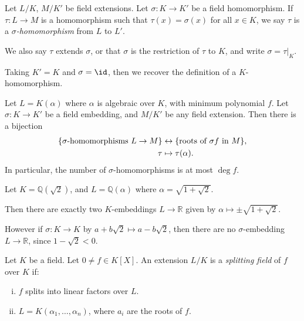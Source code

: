 \documentclass[12pt]{article}
\begin{document}
\begin{definition}
	Let $L/K$, $M/K'$ be field extensions. Let $\sigma : K \to K'$ be a field homomorphism. If $\tau : L \to M$ is a homomorphism such that $\tau(x) = \sigma(x)$ for all $x \in K$, we say $\tau$ is a $\sigma$\emph{-homomorphism} from $L$ to $L'$.

	We also say $\tau$ extends $\sigma$, or that $\sigma$ is the restriction of $\tau$ to $K$, and write $\sigma = \tau|_{K}$.
\end{definition}

Taking $K' = K$ and $\sigma = \id$, then we recover the definition of a $K$-homomorphism.

\begin{theorem}\label{thm:num_sig_homs}
	Let $L = K(\alpha)$ where $\alpha$ is algebraic over $K$, with minimum polynomial $f$. Let $\sigma : K \to K'$ be a field embedding, and $M/K'$ be any field extension. Then there is a bijection
	\begin{align*}
		\{\sigma\text{\normalfont{-homomorphisms }} L \to M\} &\leftrightarrow \{\text{\normalfont{roots of }} \sigma f \text{\normalfont{ in }} M\}, \\
		\tau &\mapsto \tau(\alpha).
	\end{align*}
	In particular, the number of $\sigma$-homomorphisms is at most $\deg f$.
\end{theorem}

\begin{exbox}
	Let $K = \mathbb{Q}(\sqrt 2)$, and $L = \mathbb{Q}(\alpha)$ where $\alpha = \sqrt{1+\sqrt 2}$.

	Then there are exactly two $K$-embeddings $L \to \mathbb{R}$ given by $\alpha \mapsto \pm \sqrt{1+\sqrt 2}$.

	However if $\sigma : K \to K$ by $a + b\sqrt 2 \mapsto a - b \sqrt 2$, then there are no $\sigma$-embedding $L \to \mathbb{R}$, since $1 - \sqrt 2 < 0$.
\end{exbox}

\begin{definition}
	Let $K$ be a field. Let $0 \neq f \in K[X]$. An extension $L/K$ is a \emph{splitting field} of $f$ over $K$ if:
	\begin{enumerate}[(i)]
		\item $f$ splits into linear factors over $L$.
		\item $L = K(\alpha_1, \ldots, \alpha_n)$, where $a_i$ are the roots of $f$.
	\end{enumerate}
\end{definition}
\end{document}
